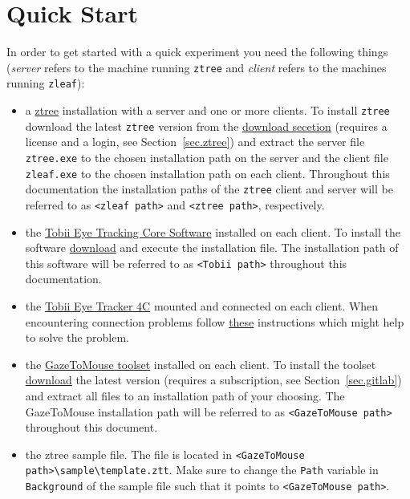 \documentclass[a4paper,oneside]{book}
\begin{document}
\chapter{Quick Start}
\label{sec.quick}
In order to get started with a quick experiment you need the following things (\emph{server} refers to the machine running \texttt{ztree} and \emph{client} refers to the machines running \texttt{zleaf}):
\begin{itemize}
    \item a \href{http://www.ztree.uzh.ch/en.html}{ztree} installation with a server and one or more clients.
        To install \texttt{ztree} download the latest \texttt{ztree} version from the \href{https://www.uzh.ch/ztree/ssl-dir/index.php}{download secetion} (requires a license and a login, see Section~\ref{sec.ztree}) and extract the server file \texttt{ztree.exe} to the chosen installation path on the server and the client file \texttt{zleaf.exe} to the chosen installation path on each client.
        Throughout this documentation the installation paths of the \texttt{ztree} client and server will be referred to as \texttt{<zleaf path>} and \texttt{<ztree path>}, respectively.
    \item the \href{https://tobiigaming.com/getstarted/}{Tobii Eye Tracking Core Software} installed on each client.
        To install the software \href{https://tobiigaming.com/downloadlatest/?bundle=tobii-core}{download} and execute the installation file.
        The installation path of this software will be referred to as \texttt{<Tobii path>} throughout this documentation.
    \item the \href{https://tobiigaming.com/eye-tracker-4c/}{Tobii Eye Tracker 4C} mounted and connected on each client.
        When encountering connection problems follow \href{https://help.tobii.com/hc/en-us/articles/115000432589-Is-your-Eye-Tracker-4C-not-connecting-}{these} instructions which might help to solve the problem.
    \item the \href{http://tpf.fluido.as:10012/TBI/TBI-tobii_eye_tracker_gaze}{GazeToMouse toolset} installed on each client.
        To install the toolset \href{http://tpf.fluido.as:10012/TBI/TBI-tobii_eye_tracker_gaze/blob/master/release}{download} the latest version (requires a subscription, see Section~\ref{sec.gitlab}) and extract all files to an installation path of your choosing.
        The GazeToMouse installation path will be referred to as \texttt{<GazeToMouse path>} throughout this document.
    \item the ztree sample file.
        The file is located in \texttt{<GazeToMouse path>\textbackslash sample\textbackslash template.ztt}.
        Make sure to change the \texttt{Path} variable in \texttt{Background} of the sample file such that it points to \texttt{<GazeToMouse path>}.
\end{itemize}
\end{document}
